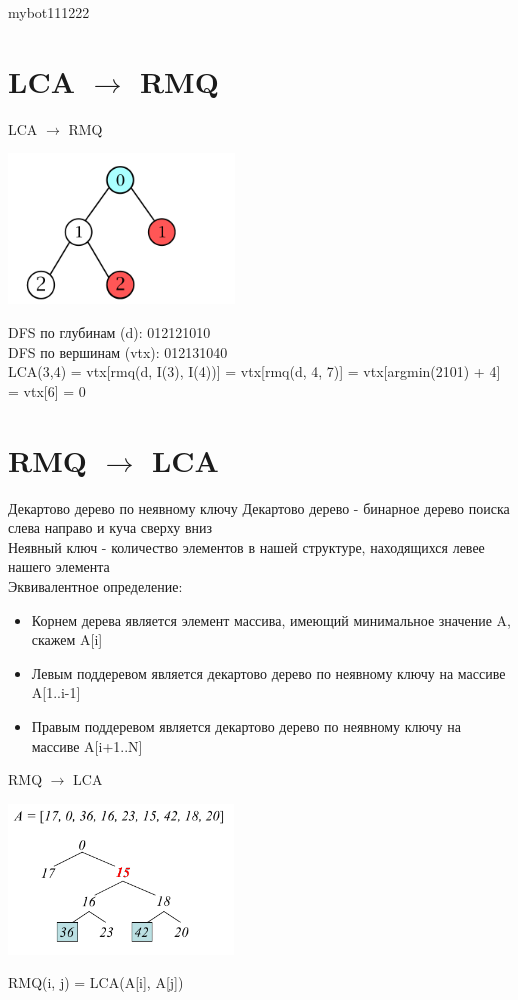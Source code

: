 mybot111222\documentclass[10pt]{beamer}
\begin{document}
\section{LCA $\rightarrow$ RMQ}
\begin{frame}[fragile]{LCA $\rightarrow$ RMQ}
\begin{center}
\includegraphics[height=4cm]{Term_2/Source/images/lca2rmq.png}\\
\end{center}
DFS по глубинам (d): 012121010\\
DFS по вершинам (vtx): 012131040\\
LCA(3,4) = vtx[rmq(d, I(3), I(4))] = vtx[rmq(d, 4, 7)] = vtx[argmin(2101) + 4] = vtx[6] = 0\\
\end{frame}

\section{RMQ $\rightarrow$ LCA}
\begin{frame}[fragile]{Декартово дерево по неявному ключу}
Декартово дерево - бинарное дерево поиска слева направо и куча сверху вниз\\
Неявный ключ - количество элементов в нашей структуре, находящихся левее нашего элемента\\
Эквивалентное определение:
\begin{itemize}
    \item Корнем дерева является элемент массива, имеющий минимальное значение A, скажем A[i]
    \item Левым поддеревом является декартово дерево по неявному ключу на массиве A[1..i-1]
    \item Правым поддеревом является декартово дерево по неявному ключу на массиве A[i+1..N]
\end{itemize}
\end{frame}

\begin{frame}[fragile]{RMQ $\rightarrow$ LCA}
\begin{center}
\includegraphics[height=4cm]{Term_2/Source/images/rmq2lca.png}\\
\end{center}
RMQ(i, j) = LCA(A[i], A[j])
\end{frame}
\end{document}
